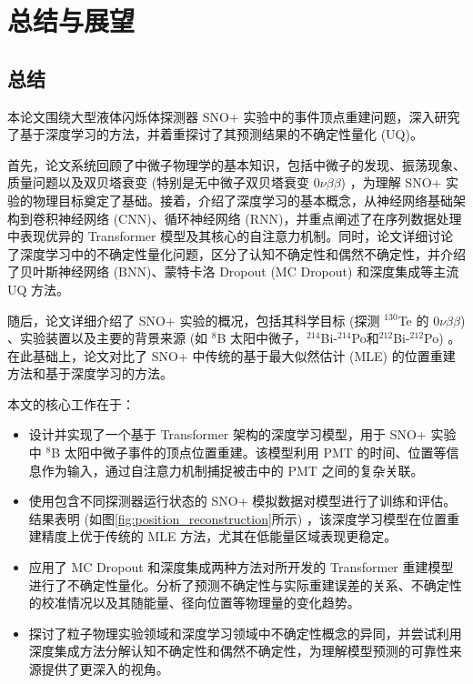 \chapter{总结与展望}

\section{总结}

本论文围绕大型液体闪烁体探测器 SNO+ 实验中的事件顶点重建问题，深入研究了基于深度学习的方法，并着重探讨了其预测结果的不确定性量化 (UQ)。

首先，论文系统回顾了中微子物理学的基本知识，包括中微子的发现、振荡现象、质量问题以及双贝塔衰变 (特别是无中微子双贝塔衰变 $0\nu\beta\beta$) ，为理解 SNO+ 实验的物理目标奠定了基础。接着，介绍了深度学习的基本概念，从神经网络基础架构到卷积神经网络 (CNN)、循环神经网络 (RNN)，并重点阐述了在序列数据处理中表现优异的 Transformer 模型及其核心的自注意力机制。同时，论文详细讨论了深度学习中的不确定性量化问题，区分了认知不确定性和偶然不确定性，并介绍了贝叶斯神经网络 (BNN)、蒙特卡洛 Dropout (MC Dropout) 和深度集成等主流 UQ 方法。

随后，论文详细介绍了 SNO+ 实验的概况，包括其科学目标 (探测 ${}^{130}$Te 的 $0\nu\beta\beta$) 、实验装置以及主要的背景来源 (如 ${}^{8}$B 太阳中微子，${}^{214}$Bi-${}^{214}$Po和${}^{212}$Bi-${}^{212}$Po) 。在此基础上，论文对比了 SNO+ 中传统的基于最大似然估计 (MLE) 的位置重建方法和基于深度学习的方法。

本文的核心工作在于：
\begin{itemize}
    \item 设计并实现了一个基于 Transformer 架构的深度学习模型，用于 SNO+ 实验中 ${}^{8}$B 太阳中微子事件的顶点位置重建。该模型利用 PMT 的时间、位置等信息作为输入，通过自注意力机制捕捉被击中的 PMT 之间的复杂关联。
    \item 使用包含不同探测器运行状态的 SNO+ 模拟数据对模型进行了训练和评估。结果表明 (如图\ref{fig:position_reconstruction}所示) ，该深度学习模型在位置重建精度上优于传统的 MLE 方法，尤其在低能量区域表现更稳定。
    \item 应用了 MC Dropout 和深度集成两种方法对所开发的 Transformer 重建模型进行了不确定性量化。分析了预测不确定性与实际重建误差的关系、不确定性的校准情况以及其随能量、径向位置等物理量的变化趋势。
    \item 探讨了粒子物理实验领域和深度学习领域中不确定性概念的异同，并尝试利用深度集成方法分解认知不确定性和偶然不确定性，为理解模型预测的可靠性来源提供了更深入的视角。
\end{itemize}

